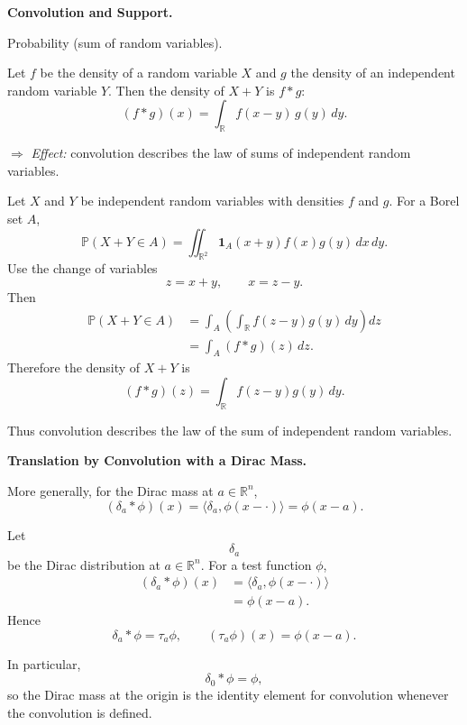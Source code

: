 \begin{problem}[CP-II-0120]
\label{prob:cp-ii-0120}
\textbf{Convolution and Support.}

\hspace*{1.5em}Probability (sum of random variables).

Let $f$ be the density of a random variable $X$ and $g$ the density of an
independent random variable $Y$. Then the density of $X+Y$ is $f*g$:
\[
(f*g)(x)
= \int_{\mathbb{R}} f(x-y)\,g(y)\,dy.
\]

\medskip
\noindent$\Rightarrow$ \emph{Effect:} convolution describes the law of
sums of independent random variables.

\clearpage
\end{problem}

\begin{solution}
Let \(X\) and \(Y\) be independent random variables with densities \(f\) and \(g\).
For a Borel set \(A\),
\[
\mathbb P(X+Y\in A)
=
\iint_{\mathbb R^2}
\mathbf1_A(x+y)f(x)g(y)\,dx\,dy.
\]
Use the change of variables
\[
z=x+y,
\qquad
x=z-y.
\]
Then
\[
\begin{aligned}
\mathbb P(X+Y\in A)
&=
\int_A
\left(
\int_{\mathbb R}
f(z-y)g(y)\,dy
\right)dz\\
&=
\int_A
(f*g)(z)\,dz.
\end{aligned}
\]
Therefore the density of \(X+Y\) is
\[
\boxed{
(f*g)(z)
=
\int_{\mathbb R}
f(z-y)g(y)\,dy.
}
\]

Thus convolution describes the law of the sum of independent random variables.
\end{solution}


\begin{problem}[CP-II-0121]
\label{prob:cp-ii-0121}
\textbf{Translation by Convolution with a Dirac Mass.}

\hspace*{1.5em}More generally, for the Dirac mass at $a\in\mathbb{R}^n$,
	\[
	(\delta_a*\phi)(x)
	= \langle\delta_a,\phi(x-\cdot)\rangle
	= \phi(x-a).
	\]
\end{problem}

\begin{solution}
Let
\[
\delta_a
\]
be the Dirac distribution at \(a\in\mathbb R^n\). For a test function \(\phi\),
\[
\begin{aligned}
(\delta_a*\phi)(x)
&=
\langle\delta_a,\phi(x-\cdot)\rangle\\
&=
\phi(x-a).
\end{aligned}
\]
Hence
\[
\boxed{
\delta_a*\phi
=
\tau_a\phi,
\qquad
(\tau_a\phi)(x)=\phi(x-a).
}
\]

In particular,
\[
\delta_0*\phi=\phi,
\]
so the Dirac mass at the origin is the identity element for convolution whenever the
convolution is defined.
\end{solution}



